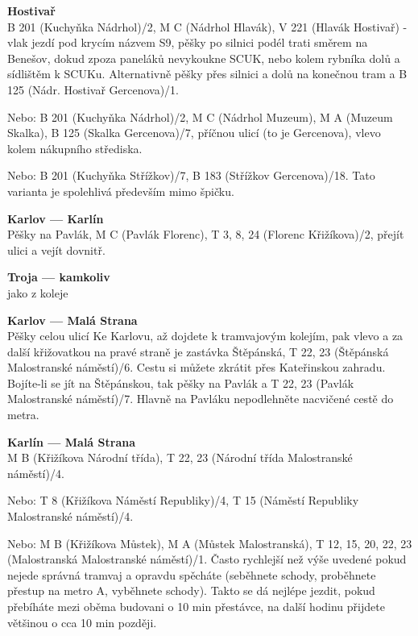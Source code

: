 \textbf{Hostivař}\\
B 201 (Kuchyňka \ra Nádrhol)/2, M C (Nádrhol \ra Hlavák), V 221 (Hlavák \ra
Hostivař) - vlak jezdí pod krycím názvem S9, pěšky po silnici podél trati směrem
na Benešov, dokud zpoza paneláků nevykoukne SCUK, nebo kolem rybníka dolů a
sídlištěm k SCUKu. Alternativně pěšky přes silnici a dolů na konečnou tram a B
125 (Nádr. Hostivař \ra Gercenova)/1.

Nebo: B 201 (Kuchyňka \ra Nádrhol)/2, M C (Nádrhol \ra Muzeum), M A (Muzeum \ra
Skalka), B 125 (Skalka \ra Gercenova)/7, příčnou ulicí (to je Gercenova), vlevo
kolem nákupního střediska.

Nebo: B 201 (Kuchyňka \ra Střížkov)/7, B 183 (Střížkov \ra Gercenova)/18. Tato
varianta je spolehlivá především mimo špičku.

\textbf{Karlov --- Karlín}\\
Pěšky na Pavlák, M C (Pavlák \ra Florenc), T 3, 8, 24 (Florenc \ra Křižíkova)/2,
přejít ulici a vejít dovnitř.

\textbf{Troja --- kamkoliv}\\
jako z koleje

\textbf{Karlov --- Malá Strana}\\
Pěšky celou ulicí Ke Karlovu, až dojdete k tramvajovým kolejím, pak vlevo a za
další křižovatkou na pravé straně je zastávka Štěpánská, T 22, 23 (Štěpánská \ra
Malostranské náměstí)/6. Cestu si můžete zkrátit přes Kateřinskou zahradu.
Bojíte-li se jít na Štěpánskou, tak pěšky na Pavlák a T 22, 23 (Pavlák \ra
Malostranské náměstí)/7. Hlavně na Pavláku nepodlehněte nacvičené cestě do
metra.

\textbf{Karlín --- Malá Strana}\\
M B (Křižíkova \ra Národní třída), T 22, 23 (Národní třída \ra Malostranské
náměstí)/4.

Nebo: T 8 (Křižíkova \ra Náměstí Republiky)/4, T 15 (Náměstí Republiky \ra
Malostranské náměstí)/4.

Nebo: M B (Křižíkova \ra Můstek), M A (Můstek \ra Malostranská), T 12, 15, 20,
22, 23 (Malostranská \ra Malostranské náměstí)/1. Často rychlejší než výše
uvedené pokud nejede správná tramvaj a opravdu spěcháte (seběhnete schody,
proběhnete přestup na metro A, vyběhnete schody). Takto se dá nejlépe jezdit,
pokud přebíháte mezi oběma budovani o 10 min přestávce, na další hodinu přijdete
většinou o cca 10 min později.